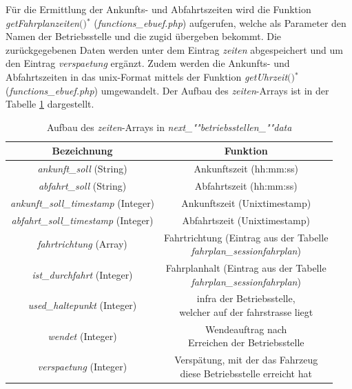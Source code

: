 Für die Ermittlung der Ankunfts- und Abfahrtszeiten wird die Funktion \textit{get\-Fahr\-plan\-zei\-ten$($$)$}$^\ast$ (\textit{functions\_ebuef.php}) aufgerufen, welche als Parameter den Namen der Betriebsstelle und die \Gls{zugid} übergeben bekommt. Die zurückgegebenen Daten werden unter dem Eintrag \textit{zeiten} abgespeichert und um den Eintrag \textit{verspaetung} ergänzt. Zudem werden die Ankunfts- und Abfahrtszeiten in das \Gls{unix}-Format mittels der Funktion \textit{getUhrzeit$($$)$}$^\ast$ (\textit{functions\_ebuef.php}) umgewandelt. Der Aufbau des \textit{zeiten}-Arrays ist in der Tabelle \ref{table:betriebsstellenzeiten} dargestellt.
\begin{table}
\begin{center}
\renewcommand{\arraystretch}{1.2}
\begin{tabular}{c|c}
Bezeichnung & Funktion \\ \hline
\textit{ankunft\_soll} (String)                  		&    Ankunftszeit (hh:mm:ss)                  \\ \hline
\textit{abfahrt\_soll} (String)                  		&     Abfahrtszeit (hh:mm:ss)                 \\ \hline
\textit{ankunft\_soll\_timestamp} (Integer)             	&   Ankunftszeit (Unixtimestamp)              \\ \hline
\textit{abfahrt\_soll\_timestamp} (Integer)             	&    Abfahrtszeit (Unixtimestamp)             \\ \hline
\textit{fahrtrichtung} (Array)                  		&   \makecell{Fahrtrichtung (Eintrag aus der Tabelle\\\textit{fahrplan\_sessionfahrplan})}                  \\ \hline
\textit{ist\_durchfahrt} (Integer)             	&    \makecell{Fahrplanhalt (Eintrag aus der Tabelle\\\textit{fahrplan\_sessionfahrplan})}               \\ \hline
\textit{used\_haltepunkt} (Integer)             	&    \makecell{\ac{infra} der Betriebsstelle,\\welcher auf der \Gls{fahrstrasse} liegt}             \\ \hline
\textit{wendet} (Integer)             	&    \makecell{Wendeauftrag nach\\Erreichen der Betriebsstelle}                \\ \hline
\textit{verspaetung} (Integer)             	&    \makecell{Verspätung, mit der das Fahrzeug\\diese Betriebsstelle erreicht hat}               \\ 
\end{tabular}
\renewcommand{\arraystretch}{1}
\caption{Aufbau des \textit{zeiten}-Arrays in \textit{next\_""betriebs\-stellen\_""data}}
\label{table:betriebsstellenzeiten}
\end{center}
\end{table}
